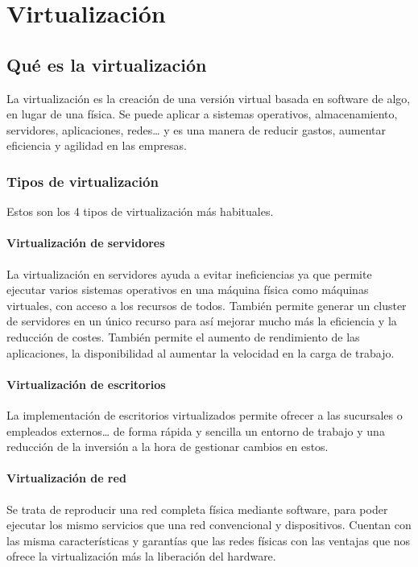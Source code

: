 \chapter{Virtualización}

\section{Qué es la virtualización}

La virtualización es la creación de una versión virtual basada en software de algo, en lugar de una física. Se puede aplicar a sistemas operativos, almacenamiento, servidores, aplicaciones, redes… y es una manera de reducir gastos, aumentar eficiencia y agilidad en las empresas.  

\subsection{Tipos de virtualización}

Estos son los 4 tipos de virtualización más habituales.
\subsubsection{Virtualización de servidores}

La virtualización en servidores ayuda a evitar ineficiencias ya que permite ejecutar varios sistemas operativos en una máquina física como máquinas virtuales, con acceso a los recursos de todos. 
También permite generar un cluster de servidores en un único recurso para así mejorar mucho más la eficiencia y la reducción de costes. También permite el aumento de rendimiento de las aplicaciones, la disponibilidad al aumentar la velocidad en la carga de trabajo.

\subsubsection{Virtualización de escritorios}

La implementación de escritorios virtualizados permite ofrecer a las sucursales o empleados externos… de forma rápida y sencilla un entorno de trabajo y una reducción de la inversión a la hora de gestionar cambios en estos. 

\subsubsection{Virtualización de red}

Se trata de reproducir una red completa física mediante software, para poder ejecutar los mismo servicios que una red convencional y dispositivos. Cuentan con las misma características y garantías que las redes físicas con las ventajas que nos ofrece la virtualización más la liberación del hardware.

